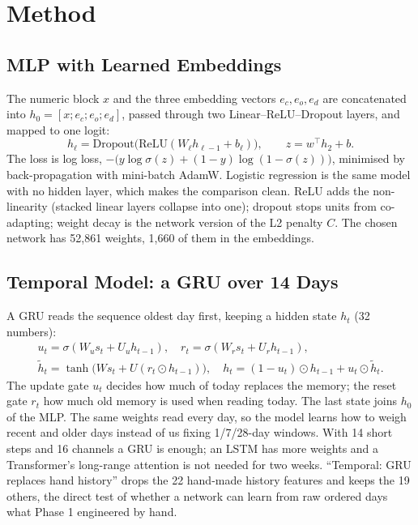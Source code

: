 \documentclass[conference]{IEEEtran}
\begin{document}
\section{Method}
\subsection{MLP with Learned Embeddings}
The numeric block $x$ and the three embedding vectors $e_c, e_o, e_d$ are concatenated into $h_0 = [x; e_c; e_o; e_d]$, passed through two Linear--ReLU--Dropout layers, and mapped to one logit:
\begin{equation}
h_\ell = \mathrm{Dropout}\big(\mathrm{ReLU}(W_\ell h_{\ell-1} + b_\ell)\big),\qquad z = w^\top h_2 + b.
\end{equation}
The loss is log loss, $-\big(y\log\sigma(z) + (1-y)\log(1-\sigma(z))\big)$, minimised by back-propagation with mini-batch AdamW. Logistic regression is the same model with no hidden layer, which makes the comparison clean. ReLU adds the non-linearity (stacked linear layers collapse into one); dropout stops units from co-adapting; weight decay is the network version of the L2 penalty $C$. The chosen network has 52,861 weights, 1,660 of them in the embeddings.

\subsection{Temporal Model: a GRU over 14 Days}
A GRU \cite{cho2014} reads the sequence oldest day first, keeping a hidden state $h_t$ (32 numbers):
\begin{gather}
u_t = \sigma(W_u s_t + U_u h_{t-1}),\quad r_t = \sigma(W_r s_t + U_r h_{t-1}),\\
\tilde h_t = \tanh\big(W s_t + U(r_t \odot h_{t-1})\big),\quad h_t = (1-u_t)\odot h_{t-1} + u_t \odot \tilde h_t .
\end{gather}
The update gate $u_t$ decides how much of today replaces the memory; the reset gate $r_t$ how much old memory is used when reading today. The last state joins $h_0$ of the MLP. The same weights read every day, so the model learns how to weigh recent and older days instead of us fixing 1/7/28-day windows. With 14 short steps and 16 channels a GRU is enough; an LSTM has more weights and a Transformer's long-range attention is not needed for two weeks. ``Temporal: GRU replaces hand history'' drops the 22 hand-made history features and keeps the 19 others, the direct test of whether a network can learn from raw ordered days what Phase 1 engineered by hand.
\end{document}
